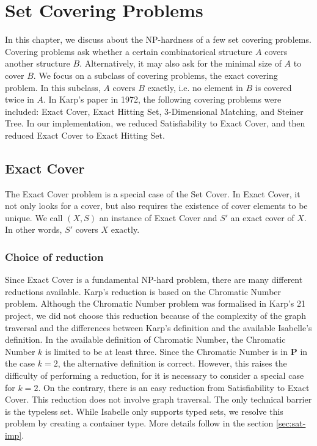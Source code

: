 \chapter{Set Covering Problems}\label{chapter:covering}
In this chapter, we discuss about the NP-hardness of a few set covering problems. 
Covering problems ask whether a certain combinatorical structure $A$ covers another structure $B$. 
Alternatively, it may also ask for the minimal size of $A$ to cover $B$. 
We focus on a subclass of covering problems, the exact covering problem. In this subclass, 
$A$ covers $B$ exactly, i.e. no element in $B$ is covered twice in $A$. 
In Karp's paper in 1972, the following covering problems were included: Exact Cover, Exact Hitting Set,
3-Dimensional Matching, and Steiner Tree. In our implementation, we reduced Satisfiability to Exact Cover, and then reduced Exact Cover to Exact Hitting Set. 

\section{Exact Cover}
The Exact Cover problem is a special case of the Set Cover. In Exact Cover, it not only looks for a cover, but also requires the existence of 
cover elements to be unique. 
We call $(X, S)$ an instance of Exact Cover and $S'$ an exact cover of $X$. In other words, $S'$ covers $X$ 
exactly.


\subsection{Choice of reduction}
Since Exact Cover is a fundamental NP-hard problem, there are many different reductions available. 
Karp's reduction is based on the  Chromatic Number problem. 
Although the Chromatic Number problem was formalised in Karp's 21 project, we did not choose this reduction
because of the complexity of the graph traversal and the differences between Karp's definition and the available Isabelle's definition. 
In the available definition of Chromatic Number, the Chromatic Number $k$ is limited to be at least three. Since 
the Chromatic Number is in \textbf{P} in the case $k = 2$, the alternative definition is correct. However, this raises the difficulty of performing 
a reduction, for it is necessary to consider a special case for $k = 2$.
On the contrary, there is an easy reduction from Satisfiability to Exact Cover. This reduction does not involve graph traversal.
The only technical barrier is the typeless set. While Isabelle only supports typed sets, we resolve this problem
by creating a container type. More details follow in the section \ref*{sec:sat-imp}. 

